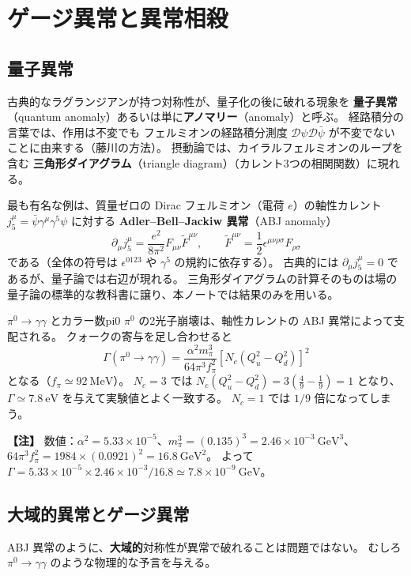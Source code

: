 \documentclass[uplatex,dvipdfmx,a4paper,11pt,openany]{jsbook}
\newcommand{\term}[2]{\textbf{#1}（#2）}
\newenvironment{note}{\vspace{1ex}\par\footnotesize\noindent\textbf{【注】}}{\par\vspace{1ex}}
\numberwithin{equation}{chapter}
\theoremstyle{definition}
\theoremstyle{plain}
\theoremstyle{remark}
\begin{document}
\section{ゲージ異常と異常相殺}
\label{sec:anomaly}
\subsection{量子異常}
古典的なラグランジアンが持つ対称性が、量子化の後に破れる現象を
\term{量子異常}{quantum anomaly}あるいは単に\term{アノマリー}{anomaly}と呼ぶ。
経路積分の言葉では、作用は不変でも
フェルミオンの経路積分測度 $\mathcal D\psi\mathcal D\bar\psi$ が不変でないことに由来する（藤川の方法）。
摂動論では、カイラルフェルミオンのループを含む
\term{三角形ダイアグラム}{triangle diagram}（カレント3つの相関関数）に現れる。

最も有名な例は、質量ゼロの Dirac フェルミオン（電荷 $e$）の軸性カレント
$j^\mu_5=\bar\psi\gamma^\mu\gamma^5\psi$ に対する
\term{Adler--Bell--Jackiw 異常}{ABJ anomaly}
\begin{equation}
\partial_\mu j^\mu_5=\frac{e^2}{8\pi^2}F_{\mu\nu}\tilde F^{\mu\nu},
\qquad
\tilde F^{\mu\nu}=\frac12\epsilon^{\mu\nu\rho\sigma}F_{\rho\sigma}
\end{equation}
である（全体の符号は $\epsilon^{0123}$ や $\gamma^5$ の規約に依存する）。
古典的には $\partial_\mu j^\mu_5=0$ であるが、量子論では右辺が現れる。
三角形ダイアグラムの計算そのものは場の量子論の標準的な教科書に譲り、本ノートでは結果のみを用いる。
\begin{myex}{$\pi^0\to\gamma\gamma$ とカラー数}{pi0}
$\pi^0$ の2光子崩壊は、軸性カレントの ABJ 異常によって支配される。
クォークの寄与を足し合わせると
\begin{equation}
\Gamma(\pi^0\to\gamma\gamma)
=\frac{\alpha^2m_\pi^3}{64\pi^3f_\pi^2}
\left[N_c\left(Q_u^2-Q_d^2\right)\right]^2
\end{equation}
となる（$f_\pi\simeq92\ \mathrm{MeV}$）。
$N_c=3$ では $N_c(Q_u^2-Q_d^2)=3\left(\frac49-\frac19\right)=1$ となり、
$\Gamma\simeq7.8\ \mathrm{eV}$ を与えて実験値とよく一致する。
$N_c=1$ では $1/9$ 倍になってしまう。
\end{myex}
\begin{note}
数値：$\alpha^2=5.33\times10^{-5}$、$m_\pi^3=(0.135)^3=2.46\times10^{-3}\ \mathrm{GeV}^3$、
$64\pi^3f_\pi^2=1984\times(0.0921)^2=16.8\ \mathrm{GeV}^2$。
よって $\Gamma=5.33\times10^{-5}\times2.46\times10^{-3}/16.8\simeq7.8\times10^{-9}\ \mathrm{GeV}$。
\end{note}
\subsection{大域的異常とゲージ異常}
ABJ 異常のように、\textbf{大域的}対称性が異常で破れることは問題ではない。
むしろ $\pi^0\to\gamma\gamma$ のような物理的な予言を与える。
\end{document}
